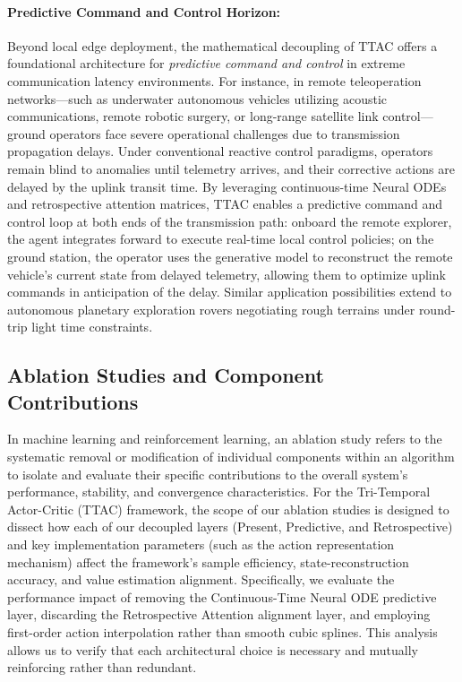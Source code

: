 \documentclass[manuscript, screen, review]{jair}
\begin{document}
\paragraph{Predictive Command and Control Horizon:} Beyond local edge deployment, the mathematical decoupling of TTAC offers a foundational architecture for \textit{predictive command and control} in extreme communication latency environments. For instance, in remote teleoperation networks---such as underwater autonomous vehicles utilizing acoustic communications, remote robotic surgery, or long-range satellite link control---ground operators face severe operational challenges due to transmission propagation delays. Under conventional reactive control paradigms, operators remain blind to anomalies until telemetry arrives, and their corrective actions are delayed by the uplink transit time. By leveraging continuous-time Neural ODEs and retrospective attention matrices, TTAC enables a predictive command and control loop at both ends of the transmission path: onboard the remote explorer, the agent integrates forward to execute real-time local control policies; on the ground station, the operator uses the generative model to reconstruct the remote vehicle's current state from delayed telemetry, allowing them to optimize uplink commands in anticipation of the delay. Similar application possibilities extend to autonomous planetary exploration rovers negotiating rough terrains under round-trip light time constraints.

\subsection{Ablation Studies and Component Contributions}
In machine learning and reinforcement learning, an ablation study refers to the systematic removal or modification of individual components within an algorithm to isolate and evaluate their specific contributions to the overall system's performance, stability, and convergence characteristics. For the Tri-Temporal Actor-Critic (TTAC) framework, the scope of our ablation studies is designed to dissect how each of our decoupled layers (Present, Predictive, and Retrospective) and key implementation parameters (such as the action representation mechanism) affect the framework's sample efficiency, state-reconstruction accuracy, and value estimation alignment. Specifically, we evaluate the performance impact of removing the Continuous-Time Neural ODE predictive layer, discarding the Retrospective Attention alignment layer, and employing first-order action interpolation rather than smooth cubic splines. This analysis allows us to verify that each architectural choice is necessary and mutually reinforcing rather than redundant.
\end{document}
